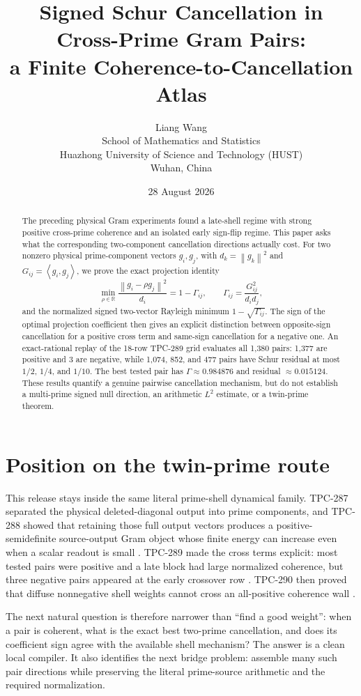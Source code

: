 \documentclass[10pt]{article}
\title{Signed Schur Cancellation in Cross-Prime Gram Pairs:\\
 a Finite Coherence-to-Cancellation Atlas}
\author{Liang Wang\\
School of Mathematics and Statistics\\
Huazhong University of Science and Technology (HUST)\\
Wuhan, China}
\date{28 August 2026}
\newcommand{\RR}{\mathbb R}
\newcommand{\norm}[1]{\left\lVert #1\right\rVert}
\newcommand{\ip}[2]{\left\langle #1,#2\right\rangle}
\begin{document}
\maketitle

\begin{abstract}
The preceding physical Gram experiments found a late-shell regime with
strong positive cross-prime coherence and an isolated early sign-flip
regime.  This paper asks what the corresponding two-component cancellation
directions actually cost.  For two nonzero physical prime-component vectors
$g_i,g_j$, with $d_k=\norm{g_k}^2$ and
$G_{ij}=\ip{g_i}{g_j}$, we prove the exact projection identity
\[
 \min_{\rho\in\RR}\frac{\norm{g_i-\rho g_j}^2}{d_i}
 =1-\Gamma_{ij},\qquad
 \Gamma_{ij}=\frac{G_{ij}^2}{d_i d_j},
\]
and the normalized signed two-vector Rayleigh minimum
$1-\sqrt{\Gamma_{ij}}$.  The sign of the optimal projection coefficient
then gives an explicit distinction between opposite-sign cancellation for a
positive cross term and same-sign cancellation for a negative one.  An
exact-rational replay of the 18-row TPC-289 grid evaluates all 1,380 pairs:
1,377 are positive and 3 are negative, while 1,074, 852, and 477 pairs have
Schur residual at most $1/2$, $1/4$, and $1/10$.  The best tested pair has
$\Gamma\approx0.984876$ and residual $\approx0.015124$.  These results
quantify a genuine pairwise cancellation mechanism, but do not establish a
multi-prime signed null direction, an arithmetic $L^2$ estimate, or a
twin-prime theorem.
\end{abstract}

\section{Position on the twin-prime route}

This release stays inside the same literal prime-shell dynamical family.
TPC-287 separated the physical deleted-diagonal output into prime
components, and TPC-288 showed that retaining those full output vectors
produces a positive-semidefinite source-output Gram object whose finite
energy can increase even when a scalar readout is small
\cite{tpc287,tpc288}.  TPC-289 made the cross terms explicit: most tested
pairs were positive and a late block had large normalized coherence, but
three negative pairs appeared at the early crossover row
\cite{tpc289}.  TPC-290 then proved that diffuse nonnegative shell weights
cannot cross an all-positive coherence wall \cite{tpc290}.

The next natural question is therefore narrower than ``find a good weight'':
when a pair is coherent, what is the exact best two-prime cancellation, and
does its coefficient sign agree with the available shell mechanism?  The
answer is a clean local compiler.  It also identifies the next bridge
problem: assemble many such pair directions while preserving the literal
prime-source arithmetic and the required normalization.
\end{document}
